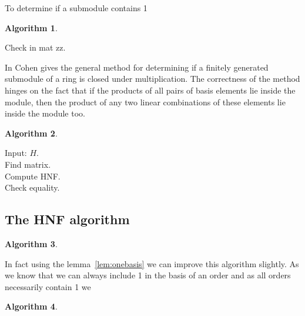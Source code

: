 \documentclass[12pt,a4paper,abstracton,bibtotoc]{scrreprt}
\theoremstyle{definition}
\newtheorem{alg}{Algorithm}
\begin{document}
To determine if a submodule contains 1 

\begin{alg}~\\
\label{alg:hasone}
\begin{algorithm}[H]
Check in mat zz.\\
\end{algorithm}
\end{alg} 

In \cite{cohen93} Cohen gives the general method for determining if a finitely generated submodule of a ring is closed under multiplication.
The correctness of the method hinges on the fact that if the products of all pairs of basis elements lie inside the module, then the product of any two linear combinations of these elements lie inside the module too.

\begin{alg}~\\
\label{alg:multclose}
\begin{algorithm}[H]
Input: $H$.\\
Find matrix.\\
Compute HNF.\\
Check equality.\\
\end{algorithm}
\end{alg} 

\subsection{The HNF algorithm}
\begin{alg}~\\
\begin{algorithm}[H]
\end{algorithm}
\end{alg}

In fact using the lemma~\ref{lem:onebasis} we can improve this algorithm slightly.
As we know that we can always include 1 in the basis of an order and as all orders necessarily contain 1 we 

\begin{alg}~\\
\begin{algorithm}[H]
\end{algorithm}
\end{alg}
\end{document}
